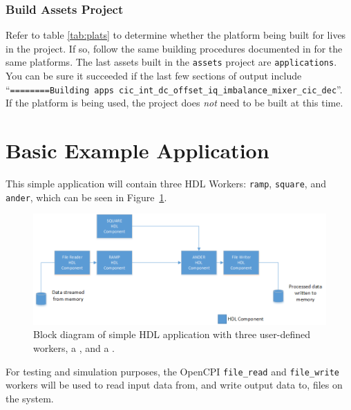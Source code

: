 \subsubsection{Build Assets Project}
Refer to table \ref{tab:plats} to determine whether the platform being built for lives in the  project. If so, follow the same building procedures documented in  for the same platforms. The last assets built in the \texttt{assets} project are \texttt{applications}. You can be sure it succeeded if the last few sections of output include ``\texttt{========Building apps cic\_int\_dc\_offset\_iq\_imbalance\_mixer\_cic\_dec}''.\\

If the  platform is being used, the  project does \textit{not} need to be built at this time.\\

\newpage
\section{Basic Example Application}
\label{sec:basic_example}

\begin{center}
\end{center}

This simple application will contain three HDL Workers: \verb+ramp+, \verb+square+, and \verb+ander+, which can be seen in Figure~\ref{fig:simple_app_diagram}. \newline

\begin{figure}[h]
        \centering
        \includegraphics[scale=0.5]{./figures/simple_app_block_diagram.png}
        \caption{Block diagram of simple HDL application with three user-defined workers, a , and a .}
        \label{fig:simple_app_diagram}
\end{figure}
For testing and simulation purposes, the OpenCPI \verb+file_read+ and \verb+file_write+ workers will be used to read input data from, and write output data to, files on the system.\newline

